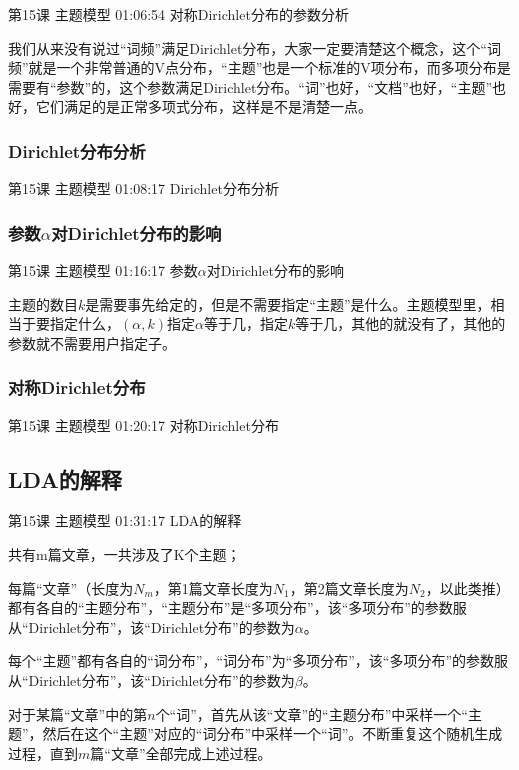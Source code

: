 \documentclass[UTF8]{ctexbook}
\begin{document}
第15课 主题模型 01:06:54 对称Dirichlet分布的参数分析

我们从来没有说过“词频”满足Dirichlet分布，大家一定要清楚这个概念，这个“词频”就是一个非常普通的V点分布，“主题”也是一个标准的V项分布，而多项分布是需要有“参数”的，这个参数满足Dirichlet分布。“词”也好，“文档”也好，“主题”也好，它们满足的是正常多项式分布，这样是不是清楚一点。

\subsubsection{Dirichlet分布分析}

第15课 主题模型 01:08:17 Dirichlet分布分析

\subsubsection{参数$\alpha$对Dirichlet分布的影响}

第15课 主题模型 01:16:17 参数$\alpha$对Dirichlet分布的影响

主题的数目$k$是需要事先给定的，但是不需要指定“主题”是什么。主题模型里，相当于要指定什么，$(\alpha , k)$指定$\alpha$等于几，指定$k$等于几，其他的就没有了，其他的参数就不需要用户指定子。

\subsubsection{对称Dirichlet分布}

第15课 主题模型 01:20:17 对称Dirichlet分布

\subsection{LDA的解释}

第15课 主题模型 01:31:17 LDA的解释

共有m篇文章，一共涉及了K个主题；

每篇“文章”（长度为$N_{m}$，第1篇文章长度为$N_{1}$，第2篇文章长度为$N_{2}$，以此类推）都有各自的“主题分布”，“主题分布”是“多项分布”，该“多项分布”的参数服从“Dirichlet分布”，该“Dirichlet分布”的参数为$\alpha$。

每个“主题”都有各自的“词分布”，“词分布”为“多项分布”，该“多项分布”的参数服从“Dirichlet分布”，该“Dirichlet分布”的参数为$\beta$。

对于某篇“文章”中的第$n$个“词”，首先从该“文章”的“主题分布”中采样一个“主题”，然后在这个“主题”对应的“词分布”中采样一个“词”。不断重复这个随机生成过程，直到$m$篇“文章”全部完成上述过程。
\end{document}
